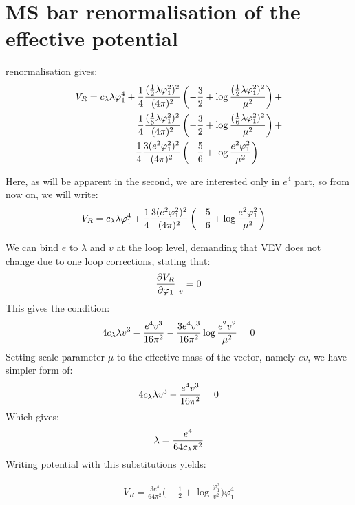 \chapter{MS bar renormalisation of the effective potential}



\MSbar renormalisation gives:
\begin{align}
V_{R}=c_\lambda\lambda\varphi_1^4 + \frac{1}{4}\frac{(\frac{1}{2}\lambda\varphi_1^2)^2}{(4\pi)^2}&\left(-\frac{3}{2}+ 
\log{\frac{(\frac{1}{2}\lambda\varphi_1^2)^2}{\mu^2}}\right) + \\
\frac{1}{4}\frac{(\frac{1}{6}\lambda\varphi_1^2)^2}{(4\pi)^2}&\left(-\frac{3}{2}+ 
\log{\frac{(\frac{1}{6}\lambda\varphi_1^2)^2}{\mu^2}}\right) + \\
\frac{1}{4}\frac{3(e^2\varphi_1^2)^2}{(4\pi)^2}&\left(-\frac{5}{6}+
\log{\frac{e^2\varphi_1^2}{\mu^2}}\right)
\end{align}

Here, as will be apparent in the second, we are interested only in $e^4$ part, so from now on, 
we will write:
\begin{align}
V_{R}=c_\lambda\lambda\varphi_1^4 + \frac{1}{4}\frac{3(e^2\varphi_1^2)^2}{(4\pi)^2}&\left(-\frac{5}{6}+
\log{\frac{e^2\varphi_1^2}{\mu^2}}\right)
\end{align}

We can bind $e$ to $\lambda$ and $v$ at the loop level, demanding that VEV does not change 
due to one loop corrections, stating that:
\begin{align}
\frac{\partial V_R}{\partial \varphi_1} \Big|_v= 0
\end{align}
This gives the condition:
\begin{align}
4c_\lambda\lambda v^3-\frac{e^4v^3}{16\pi^2}-\frac{3e^4v^3}{16\pi^2}\log\frac{e^2v^2}{\mu^2}=0
\end{align}
Setting scale parameter $\mu$ to the effective mass of the vector, namely $ev$, we have 
simpler form of:
\begin{align}
4c_\lambda\lambda v^3-\frac{e^4v^3}{16\pi^2}=0
\end{align}
Which gives:
\begin{align}\label{e4_lambda_MS}
\lambda = \frac{e^4}{64c_\lambda\pi^2}
\end{align}
Writing potential with this substitutions yields:

\begin{align}
V_R = \frac{3e^4}{64\pi^2}\Big(-\frac{1}{2}+\log\frac{\varphi_1^2}{v^2}\Big)\varphi_1^4
\end{align}



